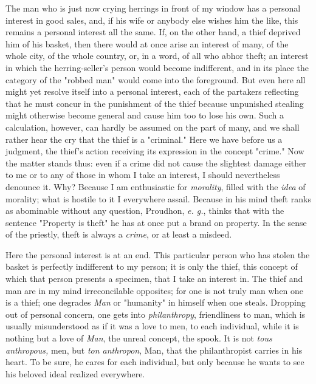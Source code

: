 \documentclass[a4paper]{book}
\begin{document}
The man who is just now crying herrings in front of my window has a personal 
interest in good sales, and, if his wife or anybody else wishes him the like, 
this remains a personal interest all the same. If, on the other hand, a thief 
deprived him of his basket, then there would at once arise an interest of 
many, of the whole city, of the whole country, or, in a word, of all who abhor 
theft; an interest in which the herring-seller's person would become 
indifferent, and in its place the category of the "{}robbed man"{} would come 
into the foreground. But even here all might yet resolve itself into a 
personal interest, each of the partakers reflecting that he must concur in the 
punishment of the thief because unpunished stealing might otherwise become 
general and cause him too to lose his own. Such a calculation, however, can 
hardly be assumed on the part of many, and we shall rather hear the cry that 
the thief is a "{}criminal."{} Here we have before us a judgment, the thief's 
action receiving its expression in the concept "{}crime."{} Now the matter 
stands thus: even if a crime did not cause the slightest damage either to me 
or to any of those in whom I take an interest, I should nevertheless denounce 
it. Why? Because I am enthusiastic for \textit{morality}, filled with the 
\textit{idea} of morality; what is hostile to it I everywhere assail. Because 
in his mind theft ranks as abominable without any question, Proudhon, 
\textit{e. g.}, thinks that with the sentence "{}Property is theft"{} he has 
at once put a brand on property. In the sense of the priestly, theft is always 
a \textit{crime}, or at least a misdeed.

Here the personal interest is at an end. This particular person who has stolen 
the basket is perfectly indifferent to my person; it is only the thief, this 
concept of which that person presents a specimen, that I take an interest in. 
The thief and man are in my mind irreconcilable opposites; for one is not 
truly man when one is a thief; one degrades \textit{Man} or "{}humanity"{} in 
himself when one steals. Dropping out of personal concern, one gets into 
\textit{philanthropy}, friendliness to man, which is usually misunderstood as 
if it was a love to men, to each individual, while it is nothing but a love of 
\textit{Man}, the unreal concept, the spook. It is not \textit{tous 
anthropous,} men, but \textit{ton anthropon}, Man, that the philanthropist 
carries in his heart. To be sure, he cares for each individual, but only 
because he wants to see his beloved ideal realized everywhere.
\end{document}
